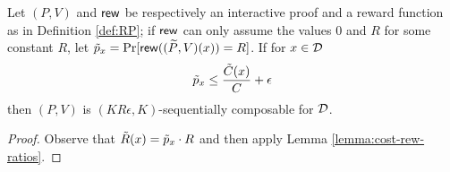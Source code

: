 \begin{corollary}
	\label{cor:prob}
	Let $(P,V)$ and $\mathsf{rew}$ be respectively an interactive proof and a reward 
	function as in 
	Definition \ref{def:RP}; if $\mathsf{rew}$ can only assume the values $0$ and $R$ for 
	some constant $R$, let $\tilde{p}_x = \Pr[\mathsf{rew}((\widetilde{P},V)(x)) = R]$. If for $x \in {\cal D}$
	$$  \tilde{p}_x \leq \frac{\tilde{C}(x)}{C} + \epsilon $$
	then $(P,V)$ is $(KR\epsilon, K)$-sequentially composable for $\cal D$. 
\end{corollary}
\begin{proof}
Observe that $\tilde{R}(x) = \tilde{p}_x\cdot R$ and then apply Lemma 
\ref{lemma:cost-rew-ratios}.
\end{proof}


